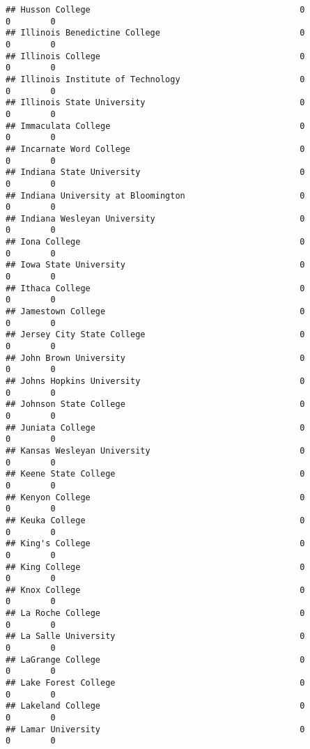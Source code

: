 \documentclass[
]{article}
\begin{document}
\begin{verbatim}
## Husson College                                          0           0        0
## Illinois Benedictine College                            0           0        0
## Illinois College                                        0           0        0
## Illinois Institute of Technology                        0           0        0
## Illinois State University                               0           0        0
## Immaculata College                                      0           0        0
## Incarnate Word College                                  0           0        0
## Indiana State University                                0           0        0
## Indiana University at Bloomington                       0           0        0
## Indiana Wesleyan University                             0           0        0
## Iona College                                            0           0        0
## Iowa State University                                   0           0        0
## Ithaca College                                          0           0        0
## Jamestown College                                       0           0        0
## Jersey City State College                               0           0        0
## John Brown University                                   0           0        0
## Johns Hopkins University                                0           0        0
## Johnson State College                                   0           0        0
## Juniata College                                         0           0        0
## Kansas Wesleyan University                              0           0        0
## Keene State College                                     0           0        0
## Kenyon College                                          0           0        0
## Keuka College                                           0           0        0
## King's College                                          0           0        0
## King College                                            0           0        0
## Knox College                                            0           0        0
## La Roche College                                        0           0        0
## La Salle University                                     0           0        0
## LaGrange College                                        0           0        0
## Lake Forest College                                     0           0        0
## Lakeland College                                        0           0        0
## Lamar University                                        0           0        0

\end{verbatim}
\end{document}
